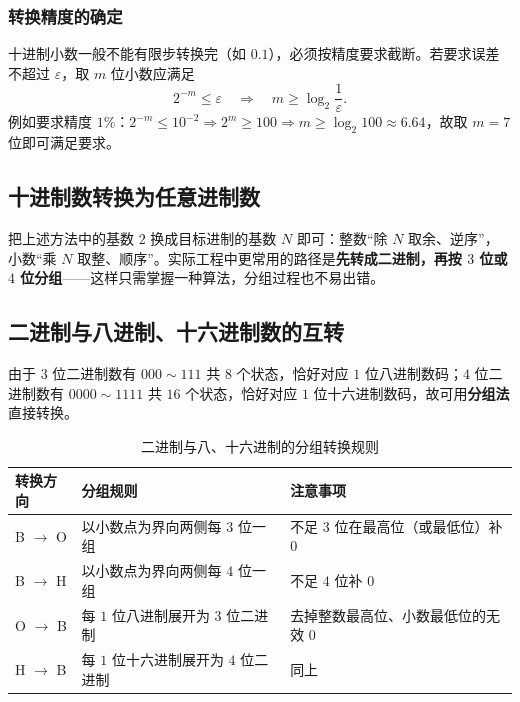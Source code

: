 \subsubsection{转换精度的确定}
十进制小数一般不能有限步转换完（如 $0.1$），必须按精度要求截断。若要求误差不超过 $\varepsilon$，取 $m$ 位小数应满足
\begin{equation}
2^{-m}\le \varepsilon
\quad\Longrightarrow\quad
m\ge \log_2\frac{1}{\varepsilon}.
\label{eq:precision}
\end{equation}
例如要求精度 $1\%$：$2^{-m}\le10^{-2}\Rightarrow2^{m}\ge100\Rightarrow m\ge\log_2 100\approx6.64$，故取 $m=7$ 位即可满足要求。

\subsection{十进制数转换为任意进制数}
把上述方法中的基数 $2$ 换成目标进制的基数 $N$ 即可：整数``除 $N$ 取余、逆序''，小数``乘 $N$ 取整、顺序''。实际工程中更常用的路径是\textbf{先转成二进制，再按 $3$ 位或 $4$ 位分组}——这样只需掌握一种算法，分组过程也不易出错。

\subsection{二进制与八进制、十六进制数的互转}
由于 $3$ 位二进制数有 $000\sim111$ 共 $8$ 个状态，恰好对应 $1$ 位八进制数码；$4$ 位二进制数有 $0000\sim1111$ 共 $16$ 个状态，恰好对应 $1$ 位十六进制数码，故可用\textbf{分组法}直接转换。

\begin{table}[!htbp]
    \centering
    \caption{二进制与八、十六进制的分组转换规则}
    \label{tab:group_convert}
    \begin{tabular}{@{}lll@{}}
        \toprule
        转换方向 & 分组规则 & 注意事项 \\
        \midrule
        B $\rightarrow$ O & 以小数点为界向两侧每 $3$ 位一组 & 不足 $3$ 位在最高位（或最低位）补 $0$ \\
        B $\rightarrow$ H & 以小数点为界向两侧每 $4$ 位一组 & 不足 $4$ 位补 $0$ \\
        O $\rightarrow$ B & 每 $1$ 位八进制展开为 $3$ 位二进制 & 去掉整数最高位、小数最低位的无效 $0$ \\
        H $\rightarrow$ B & 每 $1$ 位十六进制展开为 $4$ 位二进制 & 同上 \\
        \bottomrule
    \end{tabular}
\end{table}

